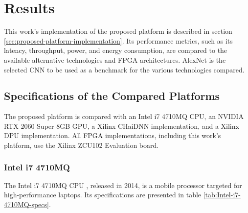 \chapter{Results}
This work's implementation of the proposed platform is described in section \ref{sec:proposed-platform-implementation}. Its performance metrics, such as its latency, throughput, power, and energy consumption, are compared to the available alternative technologies and FPGA architectures. AlexNet is the selected CNN to be used as a benchmark for the various technologies compared.

\section{Specifications of the Compared Platforms}
The proposed platform is compared with an Intel i7 4710MQ CPU, an NVIDIA RTX 2060 Super 8GB GPU, a Xilinx CHaiDNN implementation, and a Xilinx DPU implementation. All FPGA implementations, including this work's platform, use the Xilinx ZCU102 Evaluation board.



\subsection{Intel i7 4710MQ}
The Intel i7 4710MQ CPU \cite{Intel-i7-4710MQ-Processor}, released in 2014, is a mobile processor targeted for high-performance laptops. Its specifications are presented in table \ref{tab:Intel-i7-4710MQ-specs}.

